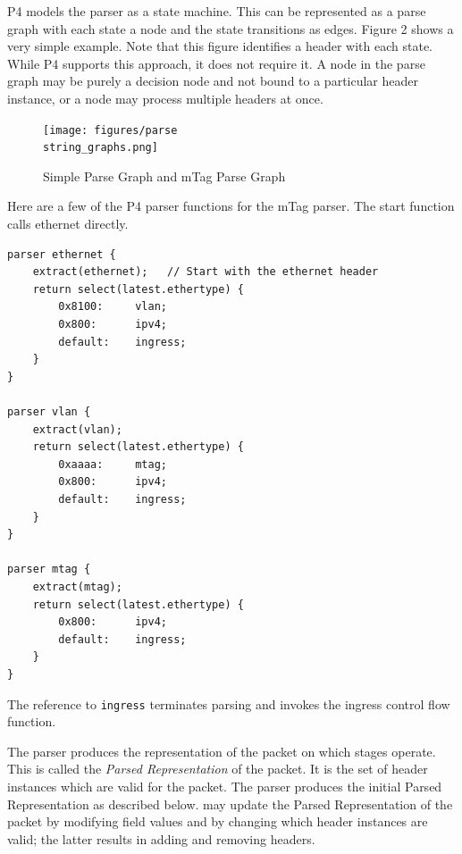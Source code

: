 \documentclass[12pt]{article}
\begin{document}

P4 models the parser as a state machine. This can be represented as a parse 
graph with each state a node and the state transitions as edges. Figure 2 
shows a very simple example. Note that this figure identifies a header with 
each state. While P4 supports this approach, it does not require it. A node 
in the parse graph may be purely a decision node and not bound to a particular 
header instance, or a node may process multiple headers at once.

\begin{figure}[h!]
    \centering
    \texttt{[image: figures/parse\\string\_graphs.png]}
    \caption{Simple Parse Graph and mTag Parse Graph}
    \label{fig:parsegraphs}
\end{figure}


Here are a few of the P4 parser functions for the mTag parser. The 
start function calls ethernet directly.

\begin{lstlisting}[style=P4style]
parser ethernet {
    extract(ethernet);   // Start with the ethernet header
    return select(latest.ethertype) {
        0x8100:     vlan;
        0x800:      ipv4;
        default:    ingress;
    }
}

parser vlan {
    extract(vlan);
    return select(latest.ethertype) {
        0xaaaa:     mtag;
        0x800:      ipv4;
        default:    ingress;
    }
}

parser mtag {
    extract(mtag);
    return select(latest.ethertype) {
        0x800:      ipv4;
        default:    ingress;
    }
}
\end{lstlisting}


The reference to \texttt{ingress} terminates parsing and invokes the ingress control 
flow function.


The parser produces the representation of the packet on which \matchaction 
stages operate. This is called the \textit{Parsed Representation} of the packet. 
It is the set of header instances which are valid for the packet. The parser 
produces the initial Parsed Representation as described below. \Matchaction 
may update the Parsed Representation of the packet by modifying field values 
and by changing which header instances are valid; the latter results in adding 
and removing headers. 
\end{document}
